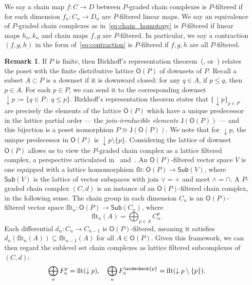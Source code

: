 \documentclass[11pt, table, nothms]{amsart}
\theoremstyle{definition}
\newtheorem{remark}[theorem]{Remark}
\newcommand{\qc}{,\quad}
\newcommand{\vp}{\widecheck{p}}
\begin{document}
{We say a chain map $f: C \to D$ between $P$-graded chain complexes is $P$-filtered if for each dimension $f_n: C_n \to D_n$ are $P$-filtered linear maps. We say an equivalence of $P$-graded chain complexes as in~\cref{eq:chain_homotopy} is $P$-filtered if linear maps $h_n,k_n$ and chain maps $f,g$ are $P$-filtered. In particular, we say a contraction $(f,g,h)$ in the form of~\cref{eq:contraction} is $P$-filtered if $f,g,h$ are all $P$-filtered. 

\begin{remark} \label{rmk:lattice}
    If $P$ is finite, then Birkhoff's representation theorem~(\cite{Birkhoff1933-jg}, or~\cite[Theorem 6.2,10.4]{Roman2008-fh}) relates the poset with the finite distributive lattice $\mathsf{O}(P)$ of downsets of $P$. Recall a subset $A \subset P$ is a downset if it is downward closed: for any $q \in A$, if $p \leq q$, then $p \in A$. For each $p \in P$, we can send it to the corresponding downset $\downarrow p := \{q \in P \ : \ q \leq p\}$. Birkhoff's representation theorem states that $\{\downarrow p\}_{p \in P}$ are precisely the elements of the lattice $\mathsf{O}(P)$ which have a unique predecessor in the lattice partial order --- the \emph{join-irreducible elements} $\mathsf{J}(\mathsf{O}(P))$ --- and this bijection is a poset isomorphism $P \cong\mathsf{J}(\mathsf{O}(P))$. We note that for $\downarrow p$, the unique predecessor in $\mathsf{O}(P)$ is $\downarrow p \setminus \{p\}$.
    Considering the lattice of downset $\mathsf{O}(P)$ allows us to view the $P$-graded chain complex as a lattice filtered complex, a perspective articulated in~\cite[\S 7.2]{harker2021} and~\cite[\S2]{spendlove2025graded}. An $\mathsf{O}(P)$-filtered vector space $V$ is one equipped with a lattice homomorphism $\mathrm{flt}: \mathsf{O}(P) \to \mathsf{Sub}(V)$, where $\mathsf{Sub}(V)$ is the lattice of vector subspaces with join $\vee = +$ and meet $\wedge = \cap$.  
    A $P$-graded chain complex $(C,d)$ is an instance of an $\mathsf{O}(P)$-filtered chain complex, in the following sense. The chain group in each dimension $C_n$ is an $\mathsf{O}(P)$-filtered vector space $\mathrm{flt}_n: \mathsf{O}(P) \to \mathsf{Sub}(C_n)$, where
    \begin{equation*}
        \mathrm{flt}_n(A) = \bigoplus_{p \in A} C^p_n.
    \end{equation*}
    Each differential $d_n: C_n \to C_{n-1}$ is $\mathsf{O}(P)$-filtered, meaning it satisfies $d_n(\mathrm{flt}_n(A)) \subseteq \mathrm{flt}_{n-1}(A)$ for all $A \in \mathsf{O}(P)$. Given this framework, we can then regard the sublevel set chain complexes as lattice filtered subcomplexes of $(C,d)$:
    \begin{equation*}
        \bigoplus_n F^p_n = \mathrm{flt}(\downarrow p)\qc \bigoplus_n F^{\vp}_n = \mathrm{flt}(\downarrow p \setminus \{p\}).
    \end{equation*}
\end{remark}

}
\end{document}

